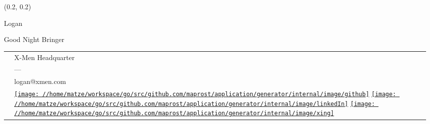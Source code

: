 \documentclass[10pt]{article}
\begin{document}
\begin{textblock}{5.5}(0.2, 0.2)

\begin{center}
\end{center}

\begin{minipage}{\textwidth}
    {\Huge Logan}
\end{minipage}


\smallskip

\begin{minipage}{\textwidth}
    Good Night Bringer
\end{minipage}

\medskip

\renewcommand{\arraystretch}{1.2}
\begin{tabular}{p{0.5cm} @{\hskip 0.2cm}p{5cm}}
    \icon{\Letter}  & X-Men Headquarter  \\
    \icon{\Telefon} & ---    \\
    \icon{\Email}   & logan@xmen.com    \\[2ex]
                    &
    
        \href{https://github.com}{\texttt{[image: //home/matze/workspace/go/src/github.com/maprost/application/generator/internal/image/github]}}
        \href{https://www.linkedin.com}{\texttt{[image: //home/matze/workspace/go/src/github.com/maprost/application/generator/internal/image/linkedIn]}}
        \href{https://www.xing.com}{\texttt{[image: //home/matze/workspace/go/src/github.com/maprost/application/generator/internal/image/xing]}}\\
\end{tabular}





\end{textblock}
\end{document}
